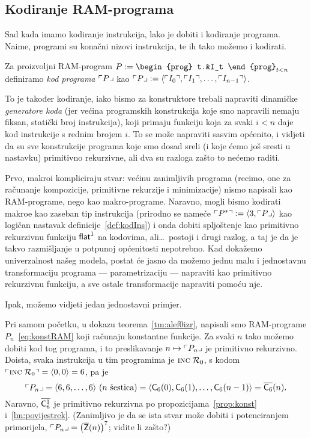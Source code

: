 \subsection{Kodiranje RAM-programa}

Sad kada imamo kodiranje instrukcija, lako je dobiti i kodiranje programa. Naime, programi su konačni nizovi instrukcija, te ih tako možemo i kodirati.

\begin{definicija}
Za proizvoljni RAM-program
$P:=\begin{prog}
t.&I_t
\end{prog}_{t<n}$
definiramo \emph{kod programa} $\ulcorner P\lrcorner$ kao
$\ulcorner P\lrcorner:=\langle\ulcorner I_0\urcorner,\ulcorner I_1\urcorner,\dotsc,\ulcorner I_{n-1}\urcorner\rangle$.
\end{definicija}

To je također kodiranje, iako bismo za konstruktore trebali napraviti dinamičke \emph{generatore koda} (jer većina programskih konstrukcija koje smo napravili nemaju fiksan, statički broj instrukcija), koji primaju funkciju koja za svaki $i<n$ daje kod instrukcije s rednim brojem $i$. To se može napraviti sasvim općenito, i vidjeti da su sve konstrukcije programa koje smo dosad sreli (i koje ćemo još sresti u nastavku) primitivno rekurzivne, ali dva su razloga zašto to nećemo raditi.

Prvo, makroi kompliciraju stvar: većinu zanimljivih programa (recimo, one za računanje kompozicije, primitivne rekurzije i minimizacije) nismo napisali kao RAM-programe, nego kao makro-programe. Naravno, mogli bismo kodirati makroe kao zaseban tip instrukcija (prirodno se nameće $\ulcorner P^*\urcorner:=\langle3,\ulcorner P\lrcorner\rangle$ kao logičan nastavak definicije~\ref{def:kodIns}) i onda dobiti spljoštenje kao primitivno rekurzivnu funkciju $\mathsf{flat}^1$ na kodovima, ali\ldots\ postoji i drugi razlog, a taj je da je takvo razmišljanje u potpunoj općenitosti nepotrebno. Kad dokažemo univerzalnost našeg modela, postat će jasno da možemo jednu malu i jednostavnu transformaciju programa --- parametrizaciju --- napraviti kao primitivno rekurzivnu funkciju, a sve ostale transformacije napraviti pomoću nje.

Ipak, možemo vidjeti jedan jednostavni primjer.

\begin{primjer}
Pri samom početku, u dokazu teorema~\ref{tm:alef0izr}, napisali smo RAM-pro\-gra\-me $P_n$~\eqref{eq:konstRAM} koji računaju konstantne funkcije. Za svaki $n$ tako možemo dobiti kod tog programa, i to preslikavanje $n\mapsto\ulcorner P_n\lrcorner$ je primitivno rekurzivno. Doista, svaka instrukcija u tim programima je $\textsc{inc}\;\mathcal R_{0}$, s kodom $\ulcorner\textsc{inc}\;\mathcal R_{0}\urcorner=\langle0,0\rangle=6$, pa je
\begin{equation}
    \ulcorner P_n\lrcorner=\langle6,6,\ldots,6\rangle\text{ ($n$ šestica)}=\langle \mathsf C_6(0),\mathsf C_6(1),\dotsc,\mathsf C_6(n-1)\rangle=\overline{\mathsf C_6}(n)\text.
\end{equation}
Naravno, $\overline{\mathsf C_6^1}$ je primitivno rekurzivna po propozicijama~\ref{prop:konst} i~\ref{lm:povijestrek}.
(Zanimljivo je da se ista stvar može dobiti i potenciranjem primorijela, $\ulcorner P_n\lrcorner=\bigl(\overline{\mathsf Z}(n)\bigr)^7$; vidite li zašto?)
\end{primjer}

